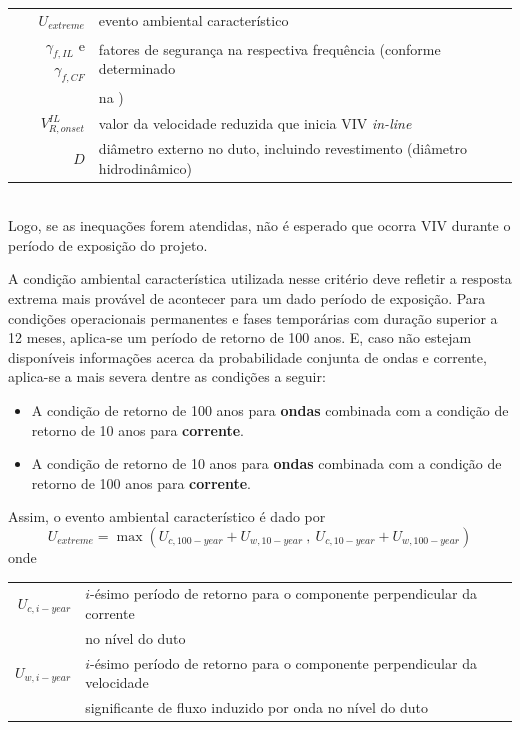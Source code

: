 \begin{tabular}{rl}
	$U_\mathit{extreme}$                                  & evento ambiental característico\\
	$\gamma_{f,\mathit{IL}}$  e  $\gamma_{f,\mathit{CF}}$ & fatores de segurança na respectiva frequência (conforme determinado \\
 	                                                      & na \dnvf105)\\
	$V_{R,\mathit{onset}}^\mathit{IL}$                    & valor da velocidade reduzida que inicia VIV \textit{in-line}\\
	$D$                                                   & diâmetro externo no duto, incluindo revestimento (diâmetro hidrodinâmico)\\
\end{tabular}\\
Logo, se as inequações forem atendidas, não é esperado que ocorra VIV durante o período de exposição do projeto.


A condição ambiental característica utilizada nesse critério deve refletir a resposta extrema mais provável de acontecer para um dado período de exposição.
Para condições operacionais permanentes e fases temporárias com duração superior a 12 meses, aplica-se um período de retorno de 100 anos.
E, caso não estejam disponíveis informações acerca da probabilidade conjunta de ondas e corrente, aplica-se a mais severa dentre as condições a seguir:
\begin{itemize}
\item A condição de retorno de 100 anos para \textbf{ondas} combinada com a condição de retorno de 10 anos para \textbf{corrente}.
\item A condição de retorno de 10 anos para \textbf{ondas} combinada com a condição de retorno de 100 anos para \textbf{corrente}.
\end{itemize}
Assim, o evento ambiental característico é dado por
\begin{equation}
U_\mathit{extreme} = \max\left( U_{c,100-\mathit{year}} + U_{w,10-\mathit{year}} ~,~ U_{c,10-\mathit{year}} + U_{w,100-\mathit{year}} \right)
\end{equation}
onde

\begin{tabular}{rl}
$U_{c,i-\mathit{year}}$ & $i$-ésimo período de retorno para o componente perpendicular da corrente \\
                        & no nível do duto\\
$U_{w,i-\mathit{year}}$ & $i$-ésimo período de retorno para o componente perpendicular da velocidade \\
                        & significante de fluxo induzido por onda no nível do duto
\end{tabular}


